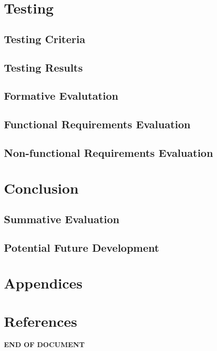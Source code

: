 \documentclass{report}
\begin{document}
\chapter{Testing}
	\section{Testing Criteria}
	\section{Testing Results}
	\section{Formative Evalutation}
	\section{Functional Requirements Evaluation}
	\section{Non-functional Requirements Evaluation}

\chapter{Conclusion}
	\section{Summative Evaluation}
	\section{Potential Future Development}


\chapter{Appendices}

\chapter{References}

\newpage
\vspace*{\fill}
\begin{center}
\textbf{END OF DOCUMENT}
\end{center}
\vfill
\end{document}

